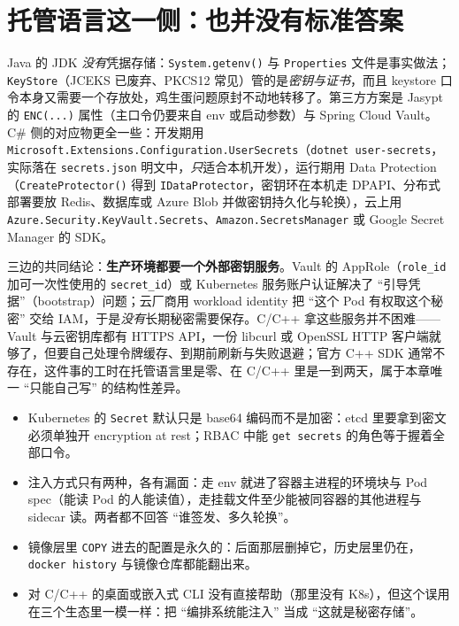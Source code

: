 \documentclass[12pt,a4paper,fontset=fandol]{ctexbook}
\newcommand{\Fn}[1]{\texttt{#1()}}
\newcommand{\Tp}[1]{\texttt{#1}}
\newcommand{\CSharp}{C\#}
\newcommand{\CppJava}{C/C++}
\begin{document}
\section{托管语言这一侧：也并没有标准答案}

Java 的 JDK \emph{没有}凭据存储：\Fn{System.getenv} 与 \Tp{Properties} 文件是事实做法；\Tp{KeyStore}（JCEKS 已废弃、PKCS12 常见）管的是\emph{密钥与证书}，而且 keystore 口令本身又需要一个存放处，鸡生蛋问题原封不动地转移了。第三方方案是 Jasypt 的 \texttt{ENC(...)} 属性（主口令仍要来自 env 或启动参数）与 Spring Cloud Vault。\CSharp{} 侧的对应物更全一些：开发期用 \Tp{Microsoft.\allowbreak Extensions.\allowbreak Configuration.\allowbreak UserSecrets}（\Tp{dotnet user-secrets}，实际落在 \Tp{secrets.json} 明文中，\emph{只}适合本机开发），运行期用 Data Protection（\Fn{CreateProtector} 得到 \Tp{IDataProtector}，密钥环在本机走 DPAPI、分布式部署要放 Redis、数据库或 Azure Blob 并做密钥持久化与轮换），云上用 \Tp{Azure.Security.KeyVault.Secrets}、\Tp{Amazon.SecretsManager} 或 Google Secret Manager 的 SDK。

三边的共同结论：\textbf{生产环境都要一个外部密钥服务}。Vault 的 AppRole（\Tp{role\_id} 加可一次性使用的 \Tp{secret\_id}）或 Kubernetes 服务账户认证解决了 ``引导凭据''（bootstrap）问题；云厂商用 workload identity 把 ``这个 Pod 有权取这个秘密'' 交给 IAM，于是\emph{没有}长期秘密需要保存。\CppJava{} 拿这些服务并不困难——Vault 与云密钥库都有 HTTPS API，一份 libcurl 或 OpenSSL HTTP 客户端就够了，但要自己处理令牌缓存、到期前刷新与失败退避；官方 C++ SDK 通常不存在，这件事的工时在托管语言里是零、在 \CppJava{} 里是一到两天，属于本章唯一 ``只能自己写'' 的结构性差异。

\begin{note}[title=容器里的 Secret 对象不是密钥库]
\begin{itemize}
  \item Kubernetes 的 \Tp{Secret} 默认只是 base64 编码而不是加密：etcd 里要拿到密文必须单独开 encryption at rest；RBAC 中能 \texttt{get secrets} 的角色等于握着全部口令。
  \item 注入方式只有两种，各有漏面：走 env 就进了容器主进程的环境块与 Pod spec（能读 Pod 的人能读值），走挂载文件至少能被同容器的其他进程与 sidecar 读。两者都不回答 ``谁签发、多久轮换''。
  \item 镜像层里 \texttt{COPY} 进去的配置是永久的：后面那层删掉它，历史层里仍在，\texttt{docker history} 与镜像仓库都能翻出来。
  \item 对 \CppJava{} 的桌面或嵌入式 CLI 没有直接帮助（那里没有 K8s），但这个误用在三个生态里一模一样：把 ``编排系统能注入'' 当成 ``这就是秘密存储''。
\end{itemize}
\end{note}
\end{document}
